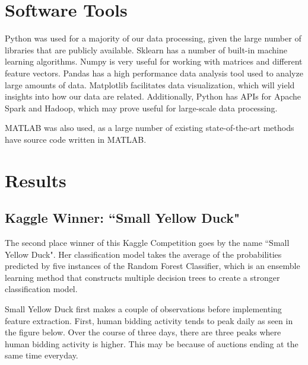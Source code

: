 \documentclass{article} %
\begin{document}
\section{Software Tools}

Python was used for a majority of our data processing, given the large number of libraries that are publicly available.
Sklearn has a number of built-in machine learning algorithms.
Numpy is very useful for working with matrices and different feature vectors.
Pandas has a high performance data analysis tool used to analyze large amounts of data.
Matplotlib facilitates data visualization, which will yield insights into how our data are related.
Additionally, Python has APIs for Apache Spark and Hadoop, which may prove useful for large-scale data processing.

MATLAB was also used, as a large number of existing state-of-the-art methods have source code written in MATLAB.

\section{Results}

\subsection{Kaggle Winner: ``Small Yellow Duck"}

The second place winner of this Kaggle Competition goes by the name ``Small Yellow Duck".
Her classification model takes the average of the probabilities predicted by five instances of the Random Forest Classifier, which is an ensemble learning method that constructs multiple decision trees to create a stronger classification model.

Small Yellow Duck first makes a couple of observations before implementing feature extraction.
First, human bidding activity tends to peak daily as seen in the figure below.
Over the course of three days, there are three peaks where human bidding activity is higher.
This may be because of auctions ending at the same time everyday.

\begin{figure}[h]
\centering
{}
\end{figure}
\end{document}
